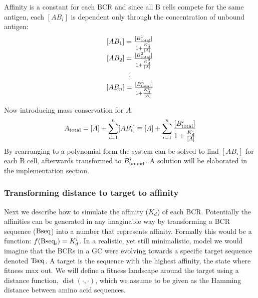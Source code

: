 \noindent
\clearpage
Affinity is a constant for each BCR and since all B cells compete for the same antigen, each $[AB_i]$ is dependent only through the concentration of unbound antigen:
\[
 \begin{matrix}
  [AB_1] = \frac{[B^1_{\text{total}}]}{1 + \frac{K^1_d}{[A]}} \\
  [AB_2] = \frac{[B^2_{\text{total}}]}{1 + \frac{K^2_d}{[A]}} \\
  \vdots \\
  [AB_n] = \frac{[B^n_{\text{total}}]}{1 + \frac{K^n_d}{[A]}} \\
 \end{matrix}
\]

\noindent
Now introducing mass conservation for $A$:
\begin{equation}
A_{\text{total}} = [A] + \sum_{i=1}^{n} [AB_i] \equiv [A] + \sum_{i=1}^{n} \frac{[B^i_{\text{total}}]}{1 + \frac{K^i_d}{[A]}}
  \label{eq:A_objective}
\end{equation}
By rearranging to a polynomial form the system can be solved to find $[AB_i]$ for each B cell, afterwards transformed to $B^i_{\text{bound}}$.
A solution will be elaborated in the implementation section.




\subsubsection{Transforming distance to target to affinity}
Next we describe how to simulate the affinity ($K_d$) of each BCR.
Potentially the affinities can be generated in any imaginable way by transforming a BCR sequence ($\text{Bseq}$) into a number that represents affinity.
Formally this would be a function: $f(\text{Bseq}_i) = K^i_d$.
In a realistic, yet still minimalistic, model we would imagine that the BCRs in a GC were evolving towards a specific target sequence denoted $\text{Tseq}$.
A target is the sequence with the highest affinity, the state where fitness max out.
We will define a fitness landscape around the target using a distance function, $\operatorname{dist}(\cdot,\cdot)$, which we assume to be given as the Hamming distance between amino acid sequences.


